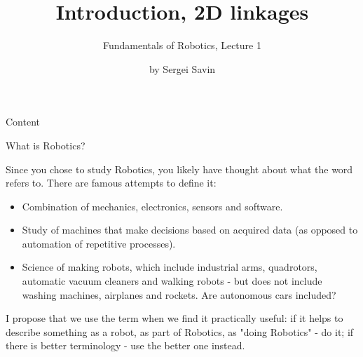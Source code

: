 \documentclass{beamer}
\title{Introduction, 2D linkages}
\subtitle{Fundamentals of Robotics, Lecture 1}
\author{by Sergei Savin}
\date{\mydate}
\begin{document}
\maketitle


\begin{frame}{Content}


\end{frame}



\begin{frame}{What is Robotics?}
\begin{flushleft}

Since you chose to study Robotics, you likely have thought about what the word refers to. There are famous attempts to define it:

\begin{itemize}
	 \item Combination of mechanics, electronics, sensors and software.
	 \item Study of machines that make decisions based on acquired data (as opposed to automation of repetitive processes).
	 \item Science of making robots, which include industrial arms, quadrotors, automatic vacuum cleaners and walking robots - but does not include washing machines, airplanes and rockets. Are autonomous cars included?
\end{itemize}

I propose that we use the term when we find it practically useful: if it helps to describe something as a robot, as part of Robotics, as "doing Robotics" - do it; if there is better terminology - use the better one instead.

\end{flushleft}
\end{frame}
\end{document}
